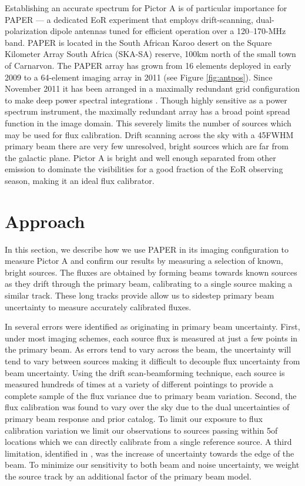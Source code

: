 \documentclass[preprint]{aastex}
\begin{document}
Establishing an accurate spectrum for Pictor A is of particular importance for
PAPER --- a dedicated EoR experiment 
that employs drift-scanning, dual-polarization dipole antennas 
tuned for efficient operation over a 120--170-MHz band.  PAPER is located in the South African Karoo desert
on the Square Kilometer Array
South Africa (SKA-SA) reserve, 100km north of the small town of Carnarvon.
The PAPER array has grown from 16 elements deployed in early 2009 to a
64-element imaging array in 2011 (see Figure \ref{fig:antpos}). 
Since November 2011 it has been arranged in a maximally redundant grid 
configuration to make deep power spectral integrations \citep{Parsons:2012p9028}.
Though highly sensitive as a power spectrum instrument, the maximally redundant array 
has a broad point spread function in the image domain. This severely limits the number 
of sources which may be used for flux calibration. Drift scanning across the sky with a 45\arcdeg FWHM
primary beam there are very few unresolved, bright sources which are far from the galactic plane. 
Pictor A is bright and well enough separated from other emission to dominate the visibilities for a good fraction of
the EoR observing season, making it an ideal flux calibrator.





\section{Approach}
\label{sec:approach}
In this section, we describe how we use PAPER in its imaging configuration
to measure Pictor A and confirm our results by measuring a  selection of known, bright sources. The fluxes are obtained
by forming beams towards known sources as they drift through the primary beam, calibrating to a single source making a similar track.
These long tracks provide allow us to sidestep primary beam uncertainty to measure accurately calibrated fluxes.


 In \citet{Jacobs:2013p9837} several errors were identified as originating in primary beam uncertainty.
  First, under most imaging schemes, each source flux is measured at just a few 
points in the primary beam. As errors tend to vary across the beam, the uncertainty will tend to vary between sources making
it difficult to decouple flux uncertainty from beam uncertainty.
 Using the drift scan-beamforming technique, each 
source is measured hundreds of times at a variety of different pointings to provide a complete sample of the
flux variance due to primary beam variation.  Second, the flux calibration was found to vary over the 
sky due to the dual uncertainties of primary beam response and prior catalog. To limit our exposure to flux calibration
variation we limit our observations to sources passing within 5\arcdeg of locations which we can directly calibrate
from a single reference source.
 A third limitation, identified in \citet{Williams:2012p8768},
was the increase of uncertainty towards the edge of the beam. To minimize our sensitivity to both beam and noise
uncertainty, we weight the source track by an additional factor of the primary beam model.  
\end{document}
